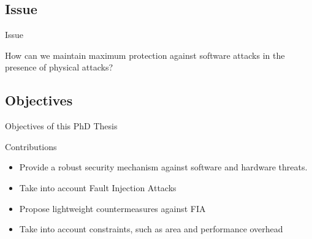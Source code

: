 \subsection{Issue}
\begin{frame}{Issue}
    \begin{exampleblock}{}
        How can we maintain maximum protection against software attacks in the presence of physical attacks?
    \end{exampleblock}
\end{frame}
\subsection{Objectives}
\begin{frame}{Objectives of this PhD Thesis}
    \begin{block}{Contributions}
        \begin{itemize}
            [triangle]
            \justifying
            \item Provide a robust security mechanism against software and hardware threats.
            \item Take into account Fault Injection Attacks
            \item Propose lightweight countermeasures against FIA
            \item Take into account constraints, such as area and performance overhead
        \end{itemize}
    \end{block}
\end{frame}
